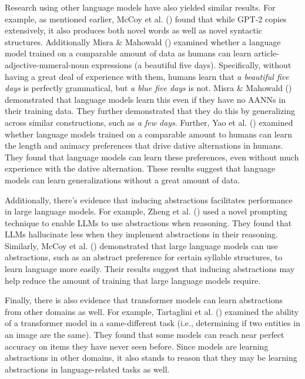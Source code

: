 \documentclass[
  12pt,
  letterpaper,
]{scrreprt}
\begin{document}
Research using other language models have also yielded similar results.
For example, as mentioned earlier, McCoy et al.
() found that while GPT-2
copies extensively, it also produces both novel words as well as novel
syntactic structures. Additionally Misra \& Mahowald
() examined whether a
language model trained on a comparable amount of data as humans can
learn article-adjective-numeral-noun expressions (a beautiful five
days). Specifically, without having a great deal of experience with
them, humans learn that \emph{a beautiful five days} is perfectly
grammatical, but \emph{a blue five days} is not. Misra \& Mahowald
() demonstrated that
language models learn this even if they have no AANNs in their training
data. They further demonstrated that they do this by generalizing across
similar constructions, such as \emph{a few days}. Further, Yao et al.
() examined whether
language models trained on a comparable amount to humans can learn the
length and animacy preferences that drive dative alternations in humans.
They found that language models can learn these preferences, even
without much experience with the dative alternation. These results
suggest that language models can learn generalizations without a great
amount of data.

Additionally, there's evidence that inducing abstractions facilitates
performance in large language models. For example, Zheng et al.
() used a novel prompting
technique to enable LLMs to use abstractions when reasoning. They found
that LLMs hallucinate less when they implement abstractions in their
reasoning. Similarly, McCoy et al.
()
demonstrated that large language models can use abstractions, such as an
abstract preference for certain syllable structures, to learn language
more easily. Their results suggest that inducing abstractions may help
reduce the amount of training that large language models require.

Finally, there is also evidence that transformer models can learn
abstractions from other domains as well. For example, Tartaglini et al.
() examined the
ability of a transformer model in a same-different task (i.e.,
determining if two entities in an image are the same). They found that
some models can reach near perfect accuracy on items they have never
seen before. Since models are learning abstractions in other domains, it
also stands to reason that they may be learning abstractions in
language-related tasks as well.
\end{document}

